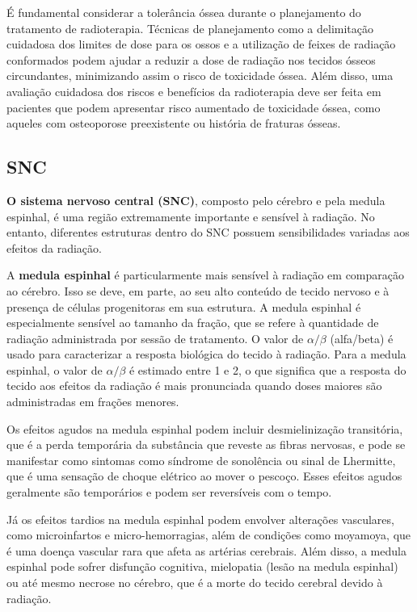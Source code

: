 \documentclass[11pt,a4paper]{article}
\begin{document}
	É fundamental considerar a tolerância óssea durante o planejamento do tratamento de radioterapia. Técnicas de planejamento como a delimitação cuidadosa dos limites de dose para os ossos e a utilização de feixes de radiação conformados podem ajudar a reduzir a dose de radiação nos tecidos ósseos circundantes, minimizando assim o risco de toxicidade óssea. Além disso, uma avaliação cuidadosa dos riscos e benefícios da radioterapia deve ser feita em pacientes que podem apresentar risco aumentado de toxicidade óssea, como aqueles com osteoporose preexistente ou história de fraturas ósseas.

\subsection*{SNC}

	\textbf{O sistema nervoso central (SNC)}, composto pelo cérebro e pela medula espinhal, é uma região extremamente importante e sensível à radiação. No entanto, diferentes estruturas dentro do SNC possuem sensibilidades variadas aos efeitos da radiação.

	A \textbf{medula espinhal} é particularmente mais sensível à radiação em comparação ao cérebro. Isso se deve, em parte, ao seu alto conteúdo de tecido nervoso e à presença de células progenitoras em sua estrutura. A medula espinhal é especialmente sensível ao tamanho da fração, que se refere à quantidade de radiação administrada por sessão de tratamento. O valor de $\alpha/\beta$ (alfa/beta) é usado para caracterizar a resposta biológica do tecido à radiação. Para a medula espinhal, o valor de $\alpha/\beta$ é estimado entre 1 e 2, o que significa que a resposta do tecido aos efeitos da radiação é mais pronunciada quando doses maiores são administradas em frações menores.

	Os efeitos agudos na medula espinhal podem incluir desmielinização transitória, que é a perda temporária da substância que reveste as fibras nervosas, e pode se manifestar como sintomas como síndrome de sonolência ou sinal de Lhermitte, que é uma sensação de choque elétrico ao mover o pescoço. Esses efeitos agudos geralmente são temporários e podem ser reversíveis com o tempo.

	Já os efeitos tardios na medula espinhal podem envolver alterações vasculares, como microinfartos e micro-hemorragias, além de condições como moyamoya, que é uma doença vascular rara que afeta as artérias cerebrais. Além disso, a medula espinhal pode sofrer disfunção cognitiva, mielopatia (lesão na medula espinhal) ou até mesmo necrose no cérebro, que é a morte do tecido cerebral devido à radiação.
\end{document}
